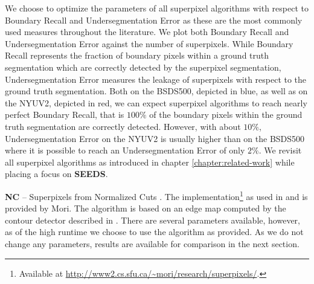 We choose to optimize the parameters of all superpixel algorithms with respect to Boundary Recall and Undersegmentation Error as these are the most commonly used measures throughout the literature. We plot both Boundary Recall and Undersegmentation Error against the number of superpixels.
While Boundary Recall represents the fraction of boundary pixels within a ground truth segmentation which are correctly detected by the superpixel segmentation, Undersegmentation Error measures the leakage of superpixels with respect to the ground truth segmentation. Both on the BSDS500, depicted in blue, as well as on the NYUV2, depicted in red, we can expect superpixel algorithms to reach nearly perfect Boundary Recall, that is $100\%$ of the boundary pixels within the ground truth segmentation are correctly detected. However, with about $10\%$, Undersegmentation Error on the NYUV2 is usually higher than on the BSDS500 where it is possible to reach an Undersegmentation Error of only $2\%$. We revisit all superpixel algorithms as introduced in chapter \ref{chapter:related-work} while placing a focus on \textbf{SEEDS}.


\textbf{NC} -- Superpixels from Normalized Cuts \cite{RenMalik:2003}. The implementation\footnote{Available at \url{http://www2.cs.sfu.ca/~mori/research/superpixels/}.} as used in \cite{MoriRenEfrosMalik:2004} and \cite{Mori:2005} is provided by Mori. The algorithm is based on an edge map computed by the contour detector described in \cite{ArbelaezMaireFowlkesMalik:2011}. There are several parameters available, however, as of the high runtime we choose to use the algorithm as provided. As we do not change any parameters, results are available for comparison in the next section.

